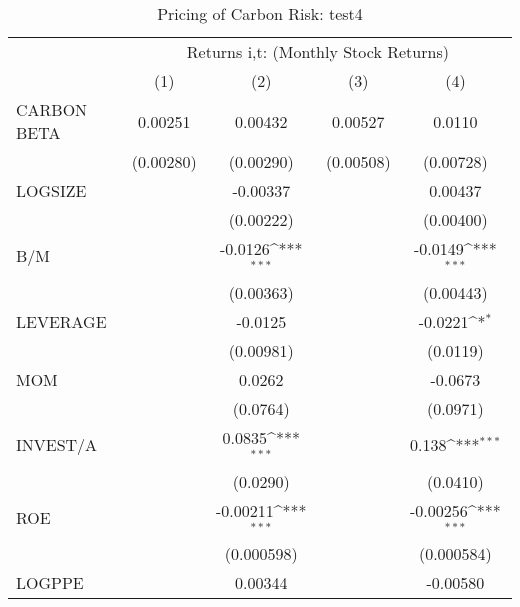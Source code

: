\begin{table}[htbp]\centering
\def\sym#1{\ifmmode^{#1}\else\(^{#1}\)\fi}
\caption{Pricing of Carbon Risk: test4}
\begin{tabular}{l*{4}{c}}
\hline\hline
                &\multicolumn{4}{c}{Returns i,t: (Monthly Stock Returns) }                  \\\cmidrule(lr){2-5}
                &\multicolumn{1}{c}{(1)}         &\multicolumn{1}{c}{(2)}         &\multicolumn{1}{c}{(3)}         &\multicolumn{1}{c}{(4)}         \\
\hline
CARBON BETA     &  0.00251         &  0.00432         &  0.00527         &   0.0110         \\
                &(0.00280)         &(0.00290)         &(0.00508)         &(0.00728)         \\
LOGSIZE         &                  & -0.00337         &                  &  0.00437         \\
                &                  &(0.00222)         &                  &(0.00400)         \\
B/M             &                  &  -0.0126\sym{***}&                  &  -0.0149\sym{***}\\
                &                  &(0.00363)         &                  &(0.00443)         \\
LEVERAGE        &                  &  -0.0125         &                  &  -0.0221\sym{*}  \\
                &                  &(0.00981)         &                  & (0.0119)         \\
MOM             &                  &   0.0262         &                  &  -0.0673         \\
                &                  & (0.0764)         &                  & (0.0971)         \\
INVEST/A        &                  &   0.0835\sym{***}&                  &    0.138\sym{***}\\
                &                  & (0.0290)         &                  & (0.0410)         \\
ROE             &                  & -0.00211\sym{***}&                  & -0.00256\sym{***}\\
                &                  &(0.000598)         &                  &(0.000584)         \\
LOGPPE          &                  &  0.00344         &                  & -0.00580         \\

\end{tabular}
\end{table}
